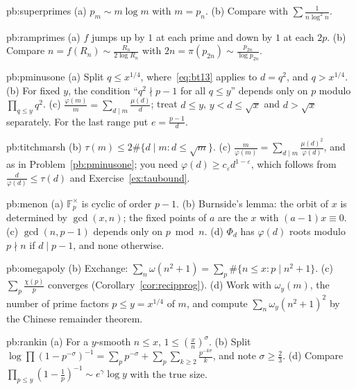 \begin{hint}{pb:superprimes}
(a) $p_m\sim m\log m$ with $m=p_n$. (b) Compare with $\sum\frac1{n\log^2n}$.
\end{hint}

\begin{hint}{pb:ramprimes}
(a) $f$ jumps up by $1$ at each prime and down by $1$ at each $2p$. (b) Compare $n=f(R_n)\sim\frac{R_n}{2\log R_n}$ with $2n=\pi(p_{2n})\sim\frac{p_{2n}}{\log p_{2n}}$.
\end{hint}

\begin{hint}{pb:pminusone}
(a) Split $q\le x^{1/4}$, where~\eqref{eq:bt13} applies to $d=q^2$, and $q>x^{1/4}$. (b) For fixed $y$, the condition ``$q^2\nmid p-1$ for all $q\le y$'' depends only on $p$
modulo $\prod_{q\le y}q^2$. (c) $\frac{\varphi(m)}m=\sum_{d\mid m}\frac{\mu(d)}d$; treat $d\le y$, $y<d\le\sqrt x$ and $d>\sqrt x$ separately. For the last range put $e=\frac{p-1}d$.
\end{hint}

\begin{hint}{pb:titchmarsh}
(b) $\tau(m)\le2\#\{d\mid m:d\le\sqrt m\}$. (c) $\frac m{\varphi(m)}=\sum_{d\mid m}\frac{\mu(d)^2}{\varphi(d)}$, and as in Problem~\ref{pb:pminusone}; you need $\varphi(d)\ge c_\varepsilon d^{1-\varepsilon}$,
which follows from $\frac d{\varphi(d)}\le\tau(d)$ and Exercise~\ref{ex:taubound}.
\end{hint}

\begin{hint}{pb:menon}
(a) $\mathbb F_p^\times$ is cyclic of order $p-1$. (b) Burnside's lemma: the orbit of $x$ is determined by $\gcd(x,n)$; the fixed points of $a$ are the $x$ with $(a-1)x\equiv0$.
(c) $\gcd(n,p-1)$ depends only on $p\bmod n$. (d) $\Phi_d$ has $\varphi(d)$ roots modulo $p\nmid n$ if $d\mid p-1$, and none otherwise.
\end{hint}

\begin{hint}{pb:omegapoly}
(b) Exchange: $\sum_n\omega(n^2+1)=\sum_p\#\{n\le x:p\mid n^2+1\}$. (c) $\sum_p\frac{\chi(p)}p$ converges (Corollary~\ref{cor:recipprog}). (d) Work with $\omega_y(m)$, the number of prime
factors $p\le y=x^{1/4}$ of $m$, and compute $\sum_n\omega_y(n^2+1)^2$ by the Chinese remainder theorem.
\end{hint}

\begin{hint}{pb:rankin}
(a) For a $y$-smooth $n\le x$, $1\le(\frac xn)^\sigma$. (b) Split $\log\prod(1-p^{-\sigma})^{-1}=\sum_pp^{-\sigma}+\sum_p\sum_{k\ge2}\frac{p^{-k\sigma}}k$, and note $\sigma\ge\frac23$.
(d) Compare $\prod_{p\le y}(1-\frac1p)^{-1}\sim e^\gamma\log y$ with the true size.
\end{hint}

